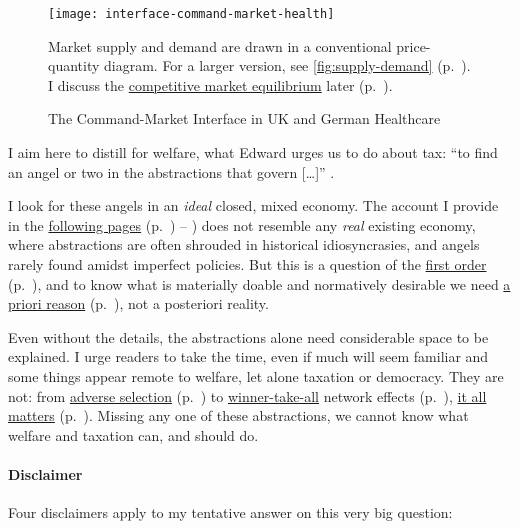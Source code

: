 \begin{landscape}
 \begin{figure}[htbp]
	\begin{center}
	\texttt{[image: interface-command-market-health]}  
	\caption[Command-Market Interface in UK and German Healthcare]{The Command-Market Interface in UK and German Healthcare}
	\label{fig:interface-command-market-health}
	\end{center}
\scriptsize{
	Market supply and demand are drawn in a conventional price-quantity diagram. 
	For a larger version, see \autoref{fig:supply-demand} (p.~\pageref{fig:supply-demand}). 
	I discuss the \hyperref[sec:market-solutions-production]{competitive market equilibrium} later (p.~\pageref{sec:market-solutions-production}).}
\end{figure}
\end{landscape}

I aim here to distill for welfare, what Edward \citeauthor{McCaffery2002} urges us to do about tax: ``to find an angel or two in the abstractions that govern [\ldots]'' \citeyearpar[K117]{McCaffery2002}. 

I look for these angels in an \emph{ideal} closed, mixed economy. 
The account I provide in the \hyperref[chap:mixed-economy]{following pages} (p.~\pageref{chap:mixed-economy}) -- \pageref{sec:EU-reality}) does not resemble any \emph{real} existing economy, where abstractions are often shrouded in historical idiosyncrasies, and angels rarely found amidst imperfect policies. 
But this is a question of the \hyperref[sec:1st-questions-first]{first order} (p.~\pageref{sec:1st-questions-first}), and to know what is materially doable and normatively desirable we need \hyperref[itm:a-priori]{a priori reason} (p.~\pageref{itm:a-priori}), not a posteriori reality. 

Even without the details, the abstractions alone need considerable space to be explained. 
I urge readers to take the time, even if much will seem familiar and some things appear remote to welfare, let alone taxation or democracy. 
They are not: from \hyperref[sec:adverse-selection]{adverse selection} (p.~\pageref{sec:adverse-selection}) to \hyperref[sec:winner-take-all]{winner-take-all} network effects (p.~\pageref{sec:winner-take-all}), \hyperref[sec:why-mixed-economy-matters]{it all matters} (p.~\pageref{sec:why-mixed-economy-matters}). 
Missing any one of these abstractions, we cannot know what welfare and taxation can, and should do.

\paragraph{Disclaimer}
Four disclaimers apply to my tentative answer on this very big question: \label{sec:disclaimers}


